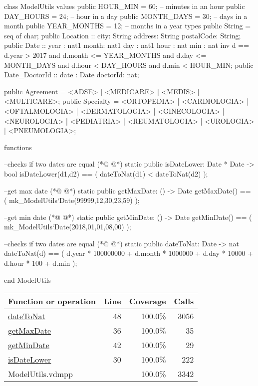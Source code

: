 \begin{vdmpp}[breaklines=true]
class ModelUtils
values
 public HOUR_MIN = 60; -- minutes in an hour
 public DAY_HOURS = 24; -- hour in a day
 public MONTH_DAYS = 30; -- days in a month
 public YEAR_MONTHS = 12; -- months in a year
types
 public String = seq of char;
 public Location :: city: String
           address: String
           postalCode: String;
 public Date :: year : nat1
         month: nat1
         day : nat1
         hour : nat
         min : nat
 inv d == d.year > 2017 and d.month <= YEAR_MONTHS and d.day <= MONTH_DAYS and d.hour < DAY_HOURS and d.min < HOUR_MIN;
 public Date_DoctorId :: date : Date
              doctorId: nat;
        
 public Agreement = <ADSE> | <MEDICARE> | <MEDIS> | <MULTICARE>;
 public Specialty = <ORTOPEDIA> | <CARDIOLOGIA> | <OFTALMOLOGIA> | 
           <DERMATOLOGIA> | <GINECOLOGIA> | <NEUROLOGIA> | 
           <PEDIATRIA> | <REUMATOLOGIA> | <UROLOGIA> |
           <PNEUMOLOGIA>;

functions
 
 --checks if two dates are equal
(*@
\label{isDateLower:30}
@*)
 static public isDateLower: Date * Date -> bool
 isDateLower(d1,d2) == (
  dateToNat(d1) < dateToNat(d2)
 );
 
 --get max date
(*@
\label{getMaxDate:36}
@*)
 static public getMaxDate: () -> Date
 getMaxDate() == (
  mk_ModelUtils`Date(99999,12,30,23,59)
 );
 
 --get min date
(*@
\label{getMinDate:42}
@*)
 static public getMinDate: () -> Date
 getMinDate() == (
  mk_ModelUtils`Date(2018,01,01,08,00)
 );
 
 --checks if two dates are equal
(*@
\label{dateToNat:48}
@*)
 static public dateToNat: Date -> nat
 dateToNat(d) == (
  d.year * 100000000 + 
  d.month * 1000000 + 
  d.day * 10000 + 
  d.hour * 100 + 
  d.min 
 );

end ModelUtils
\end{vdmpp}
\bigskip
\begin{longtable}{|l|r|r|r|}
\hline
Function or operation & Line & Coverage & Calls \\
\hline
\hline
\hyperref[dateToNat:48]{dateToNat} & 48&100.0\% & 3056 \\
\hline
\hyperref[getMaxDate:36]{getMaxDate} & 36&100.0\% & 35 \\
\hline
\hyperref[getMinDate:42]{getMinDate} & 42&100.0\% & 29 \\
\hline
\hyperref[isDateLower:30]{isDateLower} & 30&100.0\% & 222 \\
\hline
\hline
ModelUtils.vdmpp & & 100.0\% & 3342 \\
\hline
\end{longtable}


